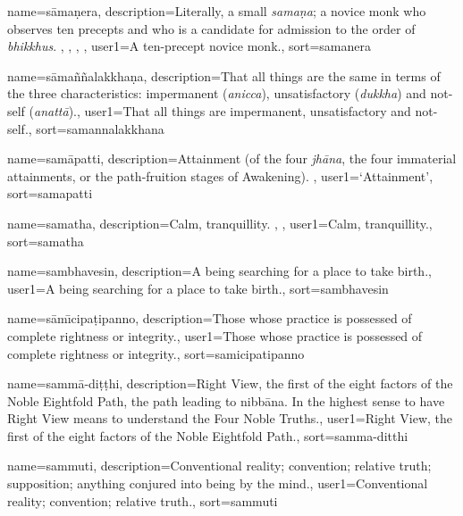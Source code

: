 {
name={s\=ama\d{n}era},
description={Literally, a small \textit{sama\d{n}a}; a novice monk who observes ten precepts and who is a candidate for admission to the order of \textit{bhikkhus}. \protect \seepre %
\protect {}, \protect {}, \protect {}, \protect {}%
\protect \seepost %
},
user1={A ten-precept novice monk.},
sort={samanera}
}

{
name=s\=ama\~n\~nalakkha\d{n}a,
description={That all things are the same in terms of the three characteristics: impermanent (\textit{anicca}), unsatisfactory (\textit{dukkha}) and not-self (\textit{anatt\=a}).},
user1={That all things are impermanent, unsatisfactory and not-self.},
sort={samannalakkhana}
}

{
name=sam\=apatti,
description={Attainment (of the four \textit{jh\=ana}, the four immaterial attainments, or the path-fruition stages of Awakening). \protect \seepre %
\protect {}%
\protect \seepost %
},
user1={`Attainment'},
sort={samapatti}
}

{
name=samatha,
description={Calm, tranquillity. \protect \seepre %
\protect {}, \protect {}%
\protect \seepost %
},
user1={Calm, tranquillity.},
sort={samatha}
}

{
name={sambhavesin},
description={A being searching for a place to take birth.},
user1={A being searching for a place to take birth.},
sort={sambhavesin}
}

{
name=s\=am\={\i}cipa\d{t}ipanno,
description={Those whose practice is possessed of complete rightness or integrity.},
user1={Those whose practice is possessed of complete rightness or integrity.},
sort={samicipatipanno}
}

{
name={samm\=a-di\d{t}\d{t}hi},
description={Right View, the first of the eight factors of the Noble Eightfold Path, the path leading to nibb\=ana. In the highest sense to have Right View means to understand the Four Noble Truths.},
user1={Right View, the first of the eight factors of the Noble Eightfold Path.},
sort={samma-ditthi}
}

{
name={sammuti},
description={Conventional reality; convention; relative truth; supposition; anything conjured into being by the mind.},
user1={Conventional reality; convention; relative truth.},
sort={sammuti}
}

